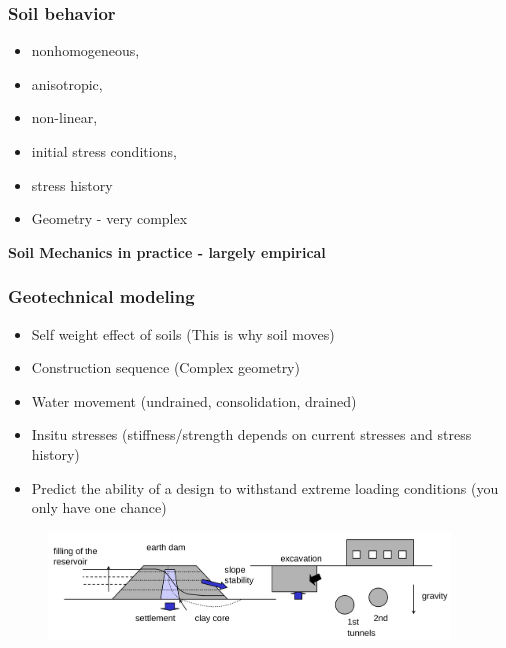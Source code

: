 \documentclass[beamer]{beamer}
\begin{document}
\begin{frame}
\frametitle{Soil behavior}
\begin{itemize}
	\item nonhomogeneous,
	\item anisotropic, 
	\item non-linear, 
	\item initial stress conditions, 
	\item stress history
	\item Geometry - very complex
\end{itemize}
\textbf{Soil Mechanics in practice - largely empirical}
\end{frame}

\begin{frame}
\frametitle{Geotechnical modeling}
\begin{itemize}
	\item Self weight effect of soils (This is why soil moves)
	\item Construction sequence (Complex geometry)
	\item Water movement (undrained, consolidation, drained)
	\item Insitu stresses (stiffness/strength depends on current stresses and stress history)
	\item Predict the ability of a design to withstand extreme loading conditions (you only have one chance)
\end{itemize}
\begin{figure}
	\includegraphics[width=0.95\textwidth]{figs/geotechnical-modeling-examples.png}
\end{figure}
\end{frame}
\end{document}
